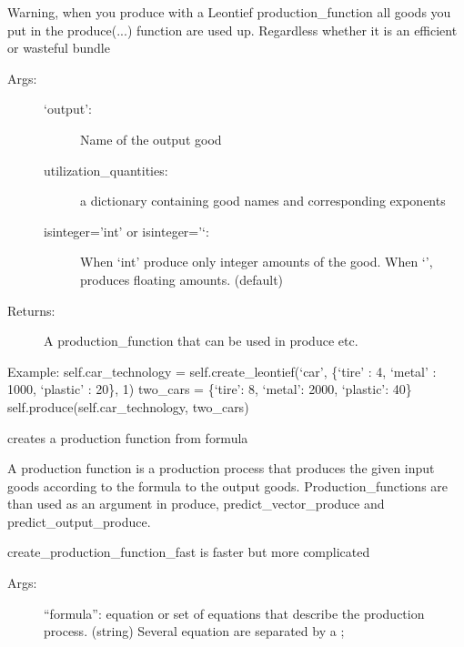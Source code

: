 \documentclass[letterpaper,10pt,english]{sphinxmanual}
\begin{document}
\begin{fulllineitems}
\begin{fulllineitems}
Warning, when you produce with a Leontief production\_function all goods you
put in the produce(...) function are used up. Regardless whether it is an
efficient or wasteful bundle
\begin{description}
\item[{Args:}] \leavevmode\begin{description}
\item[{`output':}] \leavevmode
Name of the output good

\item[{utilization\_quantities:}] \leavevmode
a dictionary containing good names and corresponding exponents

\item[{isinteger='int' or isinteger='`:}] \leavevmode
When `int' produce only integer amounts of the good.
When `', produces floating amounts. (default)

\end{description}

\item[{Returns:}] \leavevmode
A production\_function that can be used in produce etc.

\end{description}

Example:
self.car\_technology = self.create\_leontief(`car', \{`tire' : 4, `metal' : 1000, `plastic' : 20\}, 1)
two\_cars = \{`tire': 8, `metal': 2000, `plastic':  40\}
self.produce(self.car\_technology, two\_cars)

\end{fulllineitems}


\begin{fulllineitems}
\label{FirmMultiTechnologies:abce.FirmMultiTechnologies.create_production_function}
creates a production function from formula

A production function is a production process that produces the
given input  goods according to the formula to the output
goods.
Production\_functions are than used as an argument in produce,
predict\_vector\_produce and predict\_output\_produce.

create\_production\_function\_fast is faster but more complicated
\begin{description}
\item[{Args:}] \leavevmode
``formula'': equation or set of equations that describe the
production process. (string) Several equation are separated by a ;


\end{description}
\end{fulllineitems}
\end{fulllineitems}
\end{document}
